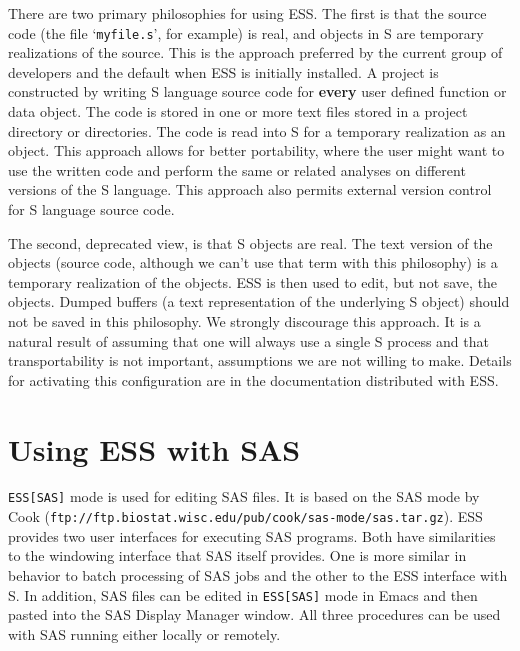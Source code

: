 \documentclass{article}
\newcommand{\stexttt}[1]{{\small\texttt{#1}}}
\newcommand{\ssf}[1]{{\small\sf{#1}}}
\newcommand{\file}[1]{`\stexttt{#1}'}
\begin{document}
There are two primary philosophies for using ESS.  The first is that
the source code (the file \file{myfile.s}, for example) is real, and
objects in S are temporary realizations of the source.  This is the
approach preferred by the current group of developers and the default
when ESS is initially installed.  A project is constructed by writing
S language source code for \textbf{every} user defined function or
data object.  The code is stored in one or more text files stored in a
project directory or directories.  The code is read into S for a
temporary realization as an object.  This approach allows for better
portability, where the user might want to use the written code and
perform the same or related analyses on different versions of the S
language.  This approach also permits external version control for S
language source code.

The second, deprecated view, is that S objects are real.  The text
version of the objects (source code, although we can't use that term
with this philosophy) is a temporary realization of the objects.  ESS
is then used to edit, but not save, the objects.
Dumped buffers (a text representation of the underlying S object)
should not be saved in this philosophy.
We strongly discourage this approach.  It is a natural result of
assuming that one will always use a single S process and that
transportability is not important, assumptions we are not willing to
make.  Details for activating this configuration are in the
documentation distributed with ESS.


\section{Using ESS with SAS}
\label{sec:SAS}

\stexttt{ESS[SAS]} mode is used for editing SAS files.  It is based on
the SAS mode by Cook
(\stexttt{ftp://ftp.biostat.wisc.edu/pub/cook/sas-mode/sas.tar.gz}).
ESS provides two user interfaces for executing SAS programs.  Both
have similarities to the windowing interface that SAS itself provides.
One is more similar in behavior to batch processing of SAS jobs and
the other to the ESS interface with S.  In addition, SAS files can be
edited in \stexttt{ESS[SAS]} mode in Emacs and then pasted into the
SAS Display Manager \ssf{Program Editor} window.  All three procedures
can be used with SAS running either locally or remotely.
\end{document}
